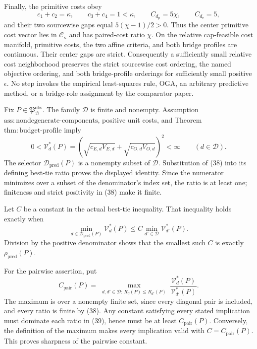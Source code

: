 Finally, the primitive costs obey
\[
 c_1+c_2=\kappa,
 \qquad c_3+c_4=1<\kappa,
 \qquad C_{d_{\mathrm p}}=5\chi,
 \qquad C_{d_{\mathrm e}}=5,
\]
and their two sourcewise gaps equal \(5(\chi-1)/2>0\).  Thus the center primitive cost vector lies in \(\mathcal C_\kappa\) and has paired-cost ratio \(\chi\).  On the relative cap-feasible cost manifold, primitive costs, the two affine criteria, and both bridge profiles are continuous.  Their center gaps are strict.  Consequently a sufficiently small relative cost neighborhood preserves the strict sourcewise cost ordering, the named objective ordering, and both bridge-profile orderings for sufficiently small positive \(\epsilon\).  No step invokes the empirical least-squares rule, OGA, an arbitrary predictive method, or a bridge-role assignment by the comparator paper.

Fix \(P\in\mathfrak P_{\mathcal D}^{\mathrm{obs}}\).  The family \(\mathcal D\) is finite and nonempty.  Assumption~\(\mathrm{ass{:}nondegenerate\text{-}components}\), positive unit costs, and Theorem~\(\mathrm{thm{:}budget\text{-}profile}\) imply
\[
 0<\mathcal V_d^*(P)
 =\left(\sqrt{c_{E,d}V_{E,d}}+
 \sqrt{c_{O,d}V_{O,d}}\right)^2<\infty
 \qquad(d\in\mathcal D).                                \tag{38}
\]
The selector \(\mathcal D_{\mathrm{pred}}(P)\) is a nonempty subset of \(\mathcal D\).  Substitution of (38) into its defining best-tie ratio proves the displayed identity.  Since the numerator minimizes over a subset of the denominator's index set, the ratio is at least one; finiteness and strict positivity in (38) make it finite.

Let \(C\) be a constant in the actual best-tie inequality.  That inequality holds exactly when
\[
 \min_{d\in\mathcal D_{\mathrm{pred}}(P)}\mathcal V_d^*(P)
 \le C\min_{d'\in\mathcal D}\mathcal V_{d'}^*(P).
\]
Division by the positive denominator shows that the smallest such \(C\) is exactly \(\rho_{\mathrm{pred}}(P)\).

For the pairwise assertion, put
\[
 C_{\mathrm{pair}}(P)=
 \max_{\substack{d,d'\in\mathcal D:\,
 R_d(P)\le R_{d'}(P)}}
 \frac{\mathcal V_d^*(P)}{\mathcal V_{d'}^*(P)}.          \tag{39}
\]
The maximum is over a nonempty finite set, since every diagonal pair is included, and every ratio is finite by (38).  Any constant satisfying every stated implication must dominate each ratio in (39), hence must be at least \(C_{\mathrm{pair}}(P)\).  Conversely, the definition of the maximum makes every implication valid with \(C=C_{\mathrm{pair}}(P)\).  This proves sharpness of the pairwise constant.

